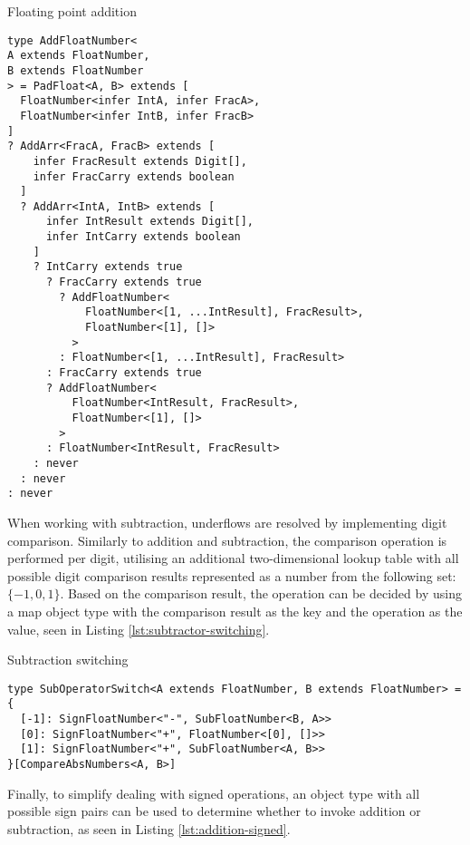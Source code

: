 \begin{listing}[ht!]
  \caption{Floating point addition}\label{lst:addition-float}
  \begin{verbatim}
type AddFloatNumber<
A extends FloatNumber,
B extends FloatNumber
> = PadFloat<A, B> extends [
  FloatNumber<infer IntA, infer FracA>,
  FloatNumber<infer IntB, infer FracB>
]
? AddArr<FracA, FracB> extends [
    infer FracResult extends Digit[],
    infer FracCarry extends boolean
  ]
  ? AddArr<IntA, IntB> extends [
      infer IntResult extends Digit[],
      infer IntCarry extends boolean
    ]
    ? IntCarry extends true
      ? FracCarry extends true
        ? AddFloatNumber<
            FloatNumber<[1, ...IntResult], FracResult>,
            FloatNumber<[1], []>
          >
        : FloatNumber<[1, ...IntResult], FracResult>
      : FracCarry extends true
      ? AddFloatNumber<
          FloatNumber<IntResult, FracResult>,
          FloatNumber<[1], []>
        >
      : FloatNumber<IntResult, FracResult>
    : never
  : never
: never
\end{verbatim}
\end{listing}

When working with subtraction, underflows are resolved by implementing digit comparison. Similarly to addition and subtraction, the comparison operation is performed per digit, utilising an additional two-dimensional lookup table with all possible digit comparison results represented as a number from the following set: $\{ -1, 0, 1 \}$. Based on the comparison result, the operation can be decided by using a map object type with the comparison result as the key and the operation as the value, seen in Listing \ref{lst:subtractor-switching}.

\begin{listing}[ht!]
  \caption{Subtraction switching}\label{lst:subtractor-switching}
  \begin{verbatim}
type SubOperatorSwitch<A extends FloatNumber, B extends FloatNumber> = {
  [-1]: SignFloatNumber<"-", SubFloatNumber<B, A>>
  [0]: SignFloatNumber<"+", FloatNumber<[0], []>>
  [1]: SignFloatNumber<"+", SubFloatNumber<A, B>>
}[CompareAbsNumbers<A, B>]
\end{verbatim}
\end{listing}

Finally, to simplify dealing with signed operations, an object type with all possible sign pairs can be used to determine whether to invoke addition or subtraction, as seen in Listing \ref{lst:addition-signed}.

